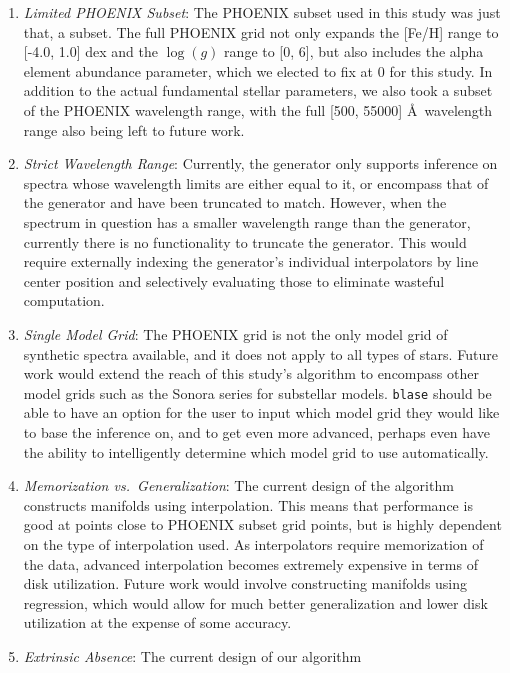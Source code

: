 \documentclass[twocolumn]{aastex631}
\begin{document}
\begin{enumerate}[label=-]
    \item \textit{Limited PHOENIX Subset}: The PHOENIX subset used in this 
    study was just that, a subset. The full PHOENIX grid not only expands 
    the [Fe/H] range to [-4.0, 1.0] dex and the $\log(g)$ range to [0, 6], 
    but also includes the alpha element abundance parameter, which we 
    elected to fix at 0 for this study. In addition to the actual fundamental 
    stellar parameters, we also took a subset of the PHOENIX wavelength range, 
    with the full [500, 55000] \AA \ wavelength range also being left to 
    future work.
    \item \textit{Strict Wavelength Range}: Currently, the generator only 
    supports inference on spectra whose wavelength limits are either equal 
    to it, or encompass that of the generator and have been truncated to 
    match. However, when the spectrum in question has a smaller wavelength 
    range than the generator, currently there is no functionality to truncate 
    the generator. This would require externally indexing the generator's 
    individual interpolators by line center position and selectively
    evaluating those to eliminate wasteful computation.
    \item \textit{Single Model Grid}: The PHOENIX grid is not the only model
    grid of synthetic spectra available, and it does not apply to all types 
    of stars. Future work would extend the reach of this study's algorithm 
    to encompass other model grids such as the Sonora series for substellar
    models. \texttt{blase} should be able to have an option for the user to 
    input which model grid they would like to base the inference on, and 
    to get even more advanced, perhaps even have the ability to intelligently
    determine which model grid to use automatically.
    \item \textit{Memorization vs.\ Generalization}: The current design of
    the algorithm constructs manifolds using interpolation. This means that
    performance is good at points close to PHOENIX subset grid points, but
    is highly dependent on the type of interpolation used. As interpolators
    require memorization of the data, advanced interpolation becomes extremely
    expensive in terms of disk utilization. Future work would involve 
    constructing manifolds using regression, which would allow for much
    better generalization and lower disk utilization at the expense of
    some accuracy.
    \item \textit{Extrinsic Absence}: The current design of our algorithm

\end{enumerate}
\end{document}
